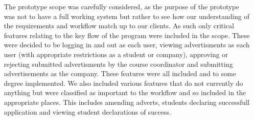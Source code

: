 The prototype scope was carefully considered, as the purpose of the prototype was not
to have a full working system but rather to see how our understanding of the requirements
and workflow match up to our clients. As such only critical features relating to the key
flow of the program were included in the scope. These were decided to be logging in and out
as each user, viewing advertisments as each user (with appropriate restrictions as a student 
or company), approving or rejecting submitted advertisments by the course coordinator and 
submitting advertisements as the company. These features were all included and to some degree
implemented. We also included various features that do not currently do anything but were
classified as important to the workflow and so included in the appropriate places. This includes 
amending adverts, students declaring successfull application and viewing student declarations
of success.

